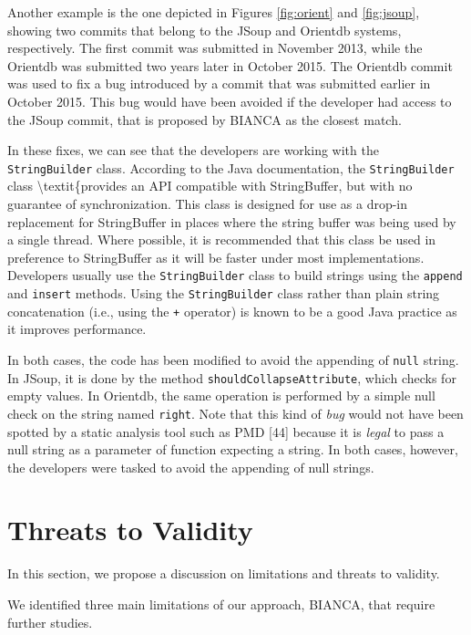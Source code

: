 \documentclass[12pt]{report}
\begin{document}
Another example is the one depicted in Figures \ref{fig:orient} and
\ref{fig:jsoup}, showing two commits that belong to the JSoup and
Orientdb systems, respectively. The first commit was submitted in
November 2013, while the Orientdb was submitted two years later in
October 2015. The Orientdb commit was used to fix a bug introduced by a
commit that was submitted earlier in October 2015. This bug would have
been avoided if the developer had access to the JSoup commit, that is
proposed by BIANCA as the closest match.



In these fixes, we can see that the developers are working with the
\texttt{StringBuilder} class. According to the Java documentation, the
\texttt{StringBuilder} class \textbackslash{}textit\{provides an API
compatible with StringBuffer, but with no guarantee of synchronization.
This class is designed for use as a drop-in replacement for StringBuffer
in places where the string buffer was being used by a single thread.
Where possible, it is recommended that this class be used in preference
to StringBuffer as it will be faster under most implementations.
Developers usually use the \texttt{StringBuilder} class to build strings
using the \texttt{append} and \texttt{insert} methods. Using the
\texttt{StringBuilder} class rather than plain string concatenation
(i.e., using the \texttt{+} operator) is known to be a good Java
practice as it improves performance.

In both cases, the code has been modified to avoid the appending of
\texttt{null} string. In JSoup, it is done by the method
\texttt{shouldCollapseAttribute}, which checks for empty values. In
Orientdb, the same operation is performed by a simple null check on the
string named \texttt{right}. Note that this kind of \textit{bug} would
not have been spotted by a static analysis tool such as PMD {[}44{]}
because it is \textit{legal} to pass a null string as a parameter of
function expecting a string. In both cases, however, the developers were
tasked to avoid the appending of null strings.

\section{Threats to Validity}\label{threats-to-validity-2}

In this section, we propose a discussion on limitations and threats to
validity.

We identified three main limitations of our approach, BIANCA, that
require further studies.
\end{document}
